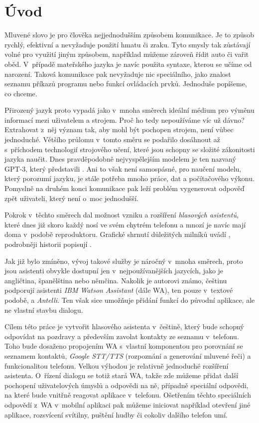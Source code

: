 \chapter*{Úvod}

Mluvené slovo je pro člověka nejjednodušším způsobem komunikace. Je to
způsob rychlý, efektivní a nevyžaduje použití hmatu či zraku. Tyto smysly
tak zůstávají volné pro využití jiným způsobem, například můžeme zároveň
řídit auto či vařit oběd. V~případě mateřského jazyka je navíc použita
syntaxe, kterou se učíme od narození. Taková komunikace pak nevyžaduje
nic speciálního, jako znalost seznamu příkazů programu nebo funkcí
ovládacích prvků. Jednoduše popíšeme, co chceme.

Přirozený jazyk proto vypadá jako v~mnoha směrech ideální médium pro výměnu
informací mezi uživatelem a strojem. Proč ho tedy nepoužíváme víc už dávno?
Extrahovat z~něj význam tak, aby mohl být pochopen strojem, není vůbec
jednoduché. Většího průlomu v~tomto směru se podařilo dosáhnout až s~příchodem
technologií strojového učení, které jsou schopny se složité zákonitosti
jazyka  naučit. Dnes pravděpodobně nejvyspělejším modelem je
ten nazvaný GPT-3, který představili \citet{brown_language_2020}.
Ani to však není samospásné, pro naučení modelu,
který porozumí jazyku, je stále potřeba mnoho práce, dat a počítačového
výkonu. Pomyslně na druhém konci komunikace pak leží problém vygenerovat
odpověď zpět uživateli, který není o~moc jednodušší.

Pokrok v~těchto směrech dal možnost vzniku a rozšíření
\textit{hlasových asistentů}, které dnes již skoro každý nosí ve svém
chytrém telefonu a mnozí je navíc mají doma v~podobě 
reproduktoru. Grafické shrnutí důležitých milníků uvádí \citet{voicebotai_2021},
podrobněji historii popisují \citet[strany 523-524]{jurafsky_slp_2020}.

Jak již bylo zmíněno, vývoj takové služby je náročný v~mnoha
směrech, proto jsou asistenti obvykle dostupní jen v~nejpoužívanějších
jazycích, jako je angličtina, španělština nebo němčina. Nakolik je autorovi
známo, češtinu podporují asistenti \textit{IBM Watson Assistant}
(dále WA), ten pouze v~textové podobě, a \textit{Antelli}. Ten však sice
umožňuje přidání funkcí do původní aplikace, ale ne vlastní stavbu dialogu.

Cílem této práce je vytvořit hlasového asistenta v~češtině, který bude schopný
odpovídat na pozdravy a především zavolat kontakty ze seznamu v~telefonu.
Toho bude dosaženo propojením WA s~vlastní komponentou
pro porovnání se seznamem kontaktů, \textit{Google STT/TTS}
(rozpoznání a generování mluvené řeči) a funkcionalitou telefonu. Velkou výhodou
je relativně jednoduché rozšíření asistenta. O~řízení dialogu se totiž stará WA,
takže zde můžeme přidat další pochopení uživatelových úmyslů a odpovědi na ně,
případně speciální odpovědi, na které bude vnitřně reagovat aplikace v~telefonu.
Ošetřením těchto speciálních odpovědí z~WA v~mobilní aplikaci pak můžeme
iniciovat například otevření jiné aplikace, rozsvícení svítilny, puštění
hudby či cokoliv dalšího telefon umí.

